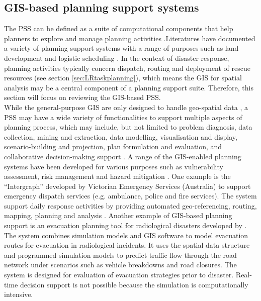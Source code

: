 \subsection{GIS-based planning support systems}
The \acf{PSS} can be defined as a suite of computational components that help planners to explore and manage planning activities \cite{Geertman2004}.Literatures have documented a variety of planning support systems with a range of purposes such as land development \cite{Pettit2003}  and logistic scheduling \cite{Miller}. In the context of disaster response, planning activities  typically concern dispatch, routing and deployment of rescue resources (see section \ref{sec:LRtaskplanning}), which means the \ac{GIS} for spatial analysis may be a central component of a planning support suite. Therefore, this section will focus on reviewing the \ac{GIS}-based \ac{PSS}. \\

While the general-purpose \ac{GIS}  are only designed to handle geo-spatial data \cite{Geertman2004}, a \ac{PSS} may have a wide variety of functionalities to support multiple aspects of planning process, which may include, but not limited to problem diagnosis, data collection, mining and extraction, data modelling, visualisation and display, scenario-building and projection, plan formulation and evaluation, and collaborative decision-making support \cite{Geertman2004,Zerger2003}. A range of the \ac{GIS}-enabled planning systems have been developed for various purposes such as vulnerability assessment, risk management and hazard mitigation \cite{Cova1999,Schooley2010}. One example is the ``Intergraph'' developed by Victorian Emergency Services (Australia) \cite{IntergraphCorporation2000} to support emergency dispatch services (e.g. ambulance, police and fire services). The system support daily response activities by providing automated geo-referencing, routing, mapping, planning and analysis \cite{Zerger2003}. Another example of \ac{GIS}-based planning support is an evacuation planning tool for radiological disasters developed by \cite{Eglese1994}. The system combines simulation models and  \ac{GIS} software to model evacuation routes for evacuation in radiological incidents.  It uses the spatial data structure and programmed simulation models to predict traffic flow through the road network under scenarios such as vehicle breakdowns and road closures. The system is designed for evaluation of evacuation strategies prior to disaster. Real-time decision support is not possible because the simulation is computationally intensive.\\

